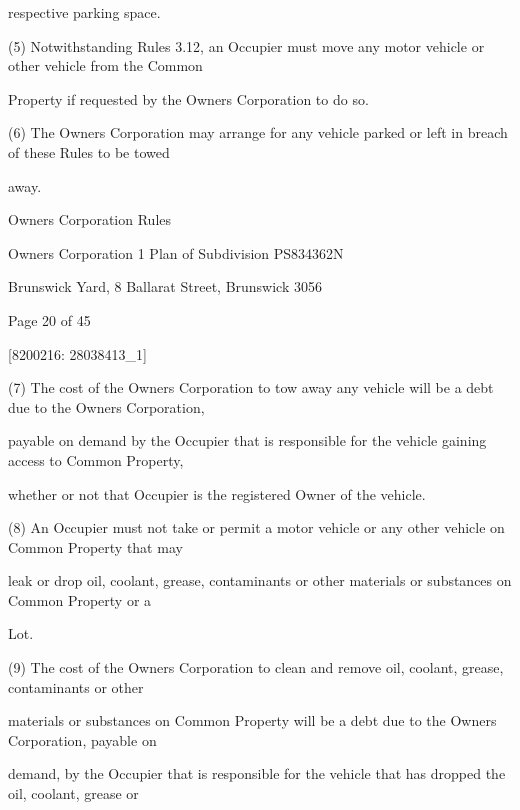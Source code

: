 \documentclass{article}
\begin{document}
{\fontsize{10.02}{1}respective parking space. }

{\fontsize{9.962}{1}(5) Notwithstanding Rules 3.12, an Occupier must move any motor vehicle or other vehicle from the Common }

{\fontsize{10.02}{1}Property if requested by the Owners Corporation to do so. }

{\fontsize{9.962}{1}(6) The Owners Corporation may arrange for any vehicle parked or left in breach of these Rules to be towed }

{\fontsize{10.02}{1}away. }

\newpage





{\fontsize{9}{1}Owners Corporation Rules }

{\fontsize{9}{1}Owners Corporation 1 Plan of Subdivision PS834362N }

{\fontsize{9}{1}Brunswick Yard, 8 Ballarat Street, Brunswick 3056 }


{\fontsize{9}{1}Page 20  of 45 }



{\fontsize{7.02}{1}[8200216: 28038413\_1] }


{\fontsize{9.962}{1}(7) The cost of the Owners Corporation to tow away any vehicle will be a debt due to the Owners Corporation, }

{\fontsize{10.02}{1}payable on demand by the Occupier that is responsible for the vehicle gaining access to Common Property, }

{\fontsize{10.02}{1}whether or not that Occupier is the registered Owner of the vehicle. }

{\fontsize{9.962}{1}(8) An Occupier must not take or permit a motor vehicle or any other vehicle on Common Property that may }

{\fontsize{10.02}{1}leak or drop oil, coolant, grease, contaminants or other materials or substances on Common Property or a }

{\fontsize{10.02}{1}Lot. }

{\fontsize{9.962}{1}(9) The cost of the Owners Corporation to clean and remove oil, coolant, grease, contaminants or other }

{\fontsize{10.02}{1}materials or substances on Common Property will be a debt due to the Owners Corporation, payable on }

{\fontsize{10.02}{1}demand, by the Occupier that is responsible for the vehicle that has dropped the oil, coolant, grease or }
\end{document}
